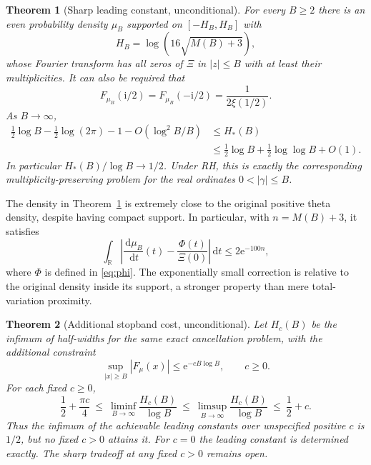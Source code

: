 \documentclass[11pt]{article}
\newtheorem{theorem}{Theorem}[section]
\theoremstyle{remark}\newtheorem{remark}[theorem]{Remark}
\newcommand{\R}{\mathbb R}\newcommand{\C}{\mathbb C}\newcommand{\e}{\mathrm e}\newcommand{\ii}{\mathrm i}\newcommand{\dd}{\,\mathrm d}\newcommand{\abs}[1]{\left|#1\right|}\newcommand{\norm}[1]{\left\|#1\right\|}\newcommand{\ord}{\operatorname{ord}}\newcommand{\re}{\operatorname{Re}}\newcommand{\im}{\operatorname{Im}}\newcommand{\supp}{\operatorname{supp}}
\begin{document}
\begin{theorem}[Sharp leading constant, unconditional]\label{thm:main}
For every $B\ge2$ there is an even probability density $\mu_B$ supported on $[-H_B,H_B]$ with
\[
 H_B=\log(16\sqrt{M(B)+3}),
\]
whose Fourier transform has all zeros of $\Xi$ in $|z|\le B$ with at least their multiplicities. It can also be required that
\begin{equation}\label{eq:matchmoment}
F_{\mu_B}(\ii/2)=F_{\mu_B}(-\ii/2)=\frac{1}{2\xi(1/2)}.
\end{equation}
As $B\to\infty$,
\begin{align}
\tfrac12\log B-\tfrac12\log(2\pi)-1-O(\log^2 B/B)
 &\le H_*(B)\label{eq:lower}\\
 &\le \tfrac12\log B+\tfrac12\log\log B+O(1).\nonumber
\end{align}
In particular $H_*(B)/\log B\to1/2$. Under RH, this is exactly the corresponding multiplicity-preserving problem for the real ordinates $0<|\gamma|\le B$.
\end{theorem}

The density in Theorem~\ref{thm:main} is extremely close to the original positive theta density, despite having compact support. In particular, with $n=M(B)+3$, it satisfies
\begin{equation}\label{eq:tvmain}
\int_\R \abs{\frac{\dd\mu_B}{\dd t}(t)-\frac{\Phi(t)}{\Xi(0)}}\dd t\le 2\e^{-100n},
\end{equation}
where $\Phi$ is defined in \eqref{eq:phi}. The exponentially small correction is relative to the original density inside its support, a stronger property than mere total-variation proximity.

\begin{theorem}[Additional stopband cost, unconditional]\label{thm:stop}
Let $H_c(B)$ be the infimum of half-widths for the same exact cancellation problem, with the additional constraint
\[
\sup_{|x|\ge B}|F_\mu(x)|\le \e^{-cB\log B},\qquad c\ge0.
\]
For each fixed $c\ge0$,
\begin{equation}\label{eq:trade}
\frac12+\frac{\pi c}{4}\ \le\ \liminf_{B\to\infty}\frac{H_c(B)}{\log B}\ \le\ \limsup_{B\to\infty}\frac{H_c(B)}{\log B}\ \le\ \frac12+c.
\end{equation}
Thus the infimum of the achievable leading constants over unspecified positive $c$ is $1/2$, but no fixed $c>0$ attains it. For $c=0$ the leading constant is determined exactly. The sharp tradeoff at any fixed $c>0$ remains open.
\end{theorem}
\end{document}
